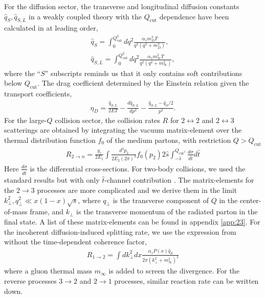 \documentclass[aps, prc, reprint, amsmath, groupedaddress, nofootinbib]{revtex4-1}
\begin{document}
For the diffusion sector, the transverse and longitudinal diffusion constants $\hat{q}_S, \hat{q}_{S,L}$ in a weakly coupled theory with the $Q_{\textrm{cut}}$ dependence have been calculated in \cite{Ghiglieri:2015ala} at leading order,
\begin{eqnarray}
\hat{q}_S = \int_0^{Q_{\textrm{cut}}^2} dq^2 \frac{\alpha_s m_D^2 T}{q^2 (q^2+m_D^2)},
\label{eq:qS} \\
\hat{q}_{S,L} = \int_0^{Q_{\textrm{cut}}^2} dq^2 \frac{\alpha_s m_\infty^2 T}{q^2 (q^2+m_\infty^2)}
\label{eq:qSL}, 
\end{eqnarray}
where the ``$S$'' subscripts reminds us that it only contains soft contributions below $Q_{\textrm{cut}}$.
The drag coefficient determined by the Einstein relation given the transport coefficients,
\begin{eqnarray}
\eta_D = \frac{\hat{q}_{S,L}}{2ET} - \frac{d\hat{q}_{S,L}}{dp^2} - \frac{\hat{q}_{S,L} - \hat{q}_S/2}{p^2}.
\end{eqnarray}
For the large-$Q$ collision sector, the collision rates $R$ for  $2\leftrightarrow2$ and $2\leftrightarrow3$ scatterings are obtained by integrating the vacuum matrix-element over the thermal distribution function $f_0$ of the medium partons, with restriction $Q > Q_{\textrm{cut}}$
\begin{eqnarray}
R_{2\rightarrow n} = \frac{g_i}{2E_1}\int  \frac{d^3p_2}{2E_2(2\pi)^3} f_0(p_2)2\hat{s} \int_{-\hat{s}}^{Q_{\textrm{cut}^2}}\frac{d\sigma}{d\hat{t}}d\hat{t}
\label{eq:incoh_rate}
\end{eqnarray}
Here $\frac{d\sigma}{d\hat{t}}$ is the differential cross-sections. 
For two-body collisions, we used the standard results but with only $\hat{t}$-channel contribution \cite{RevModPhys.59.465}.
The matrix-elements for the $2\rightarrow 3$ processes are more complicated and we derive them in the limit $k_\perp^2, q_\perp^2 \ll x(1-x)\sqrt{s}$, where $q_\perp$ is the transverse component of $Q$ in the center-of-mass frame, and $k_\perp$ is the transverse momentum of the radiated parton in the final state. 
A list of these matrix-elements can be found in appendix \ref{app:23}.
For the incoherent diffusion-induced splitting rate, we use the expression from \cite{Cao:2017hhk} without the time-dependent coherence factor,
\begin{eqnarray}
R_{1\rightarrow 2} = \int d k_\perp^2 dx \frac{\alpha_s P(x) \hat{q}_S}{2\pi (k_\perp^2 + m_\infty^2)^2}
\end{eqnarray}
where a gluon thermal mass $m_\infty$ is added to screen the divergence.
For the reverse processes $3\rightarrow 2$  and $2\rightarrow 1$ processes, similar reaction rate can be written down.
\end{document}
